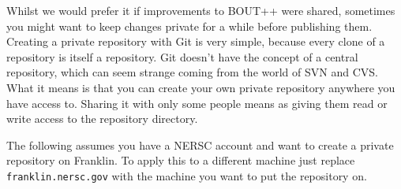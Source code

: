 \documentclass[12pt]{article}
\begin{document}
Whilst we would prefer it if improvements to BOUT++ were shared, 
sometimes you might want to keep changes private for a while before
publishing them. Creating a private repository with Git is very simple,
because every clone of a repository is itself a repository.
Git doesn't have the concept of a
central repository, which can seem strange coming from the world of SVN and
CVS. What it means is that you can create your own private repository
anywhere you have access to. Sharing it with only some people means
as giving them read or write access to the repository directory.

The following assumes you have a NERSC account and want to create a private
repository on Franklin. To apply this to a different machine just replace
\texttt{franklin.nersc.gov} with the machine you want to put the repository on.
\end{document}
